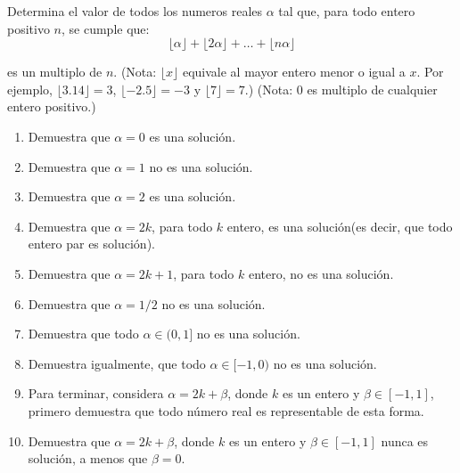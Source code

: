 \documentclass{article}
\begin{document}
Determina el valor de todos los numeros reales $\alpha$ tal que, para todo entero positivo $n$, se cumple que:
\[
    \lfloor \alpha \rfloor + \lfloor 2\alpha \rfloor + \ldots + \lfloor n\alpha \rfloor
\]

es un multiplo de $n$.
(Nota: $\lfloor x \rfloor$ equivale al mayor entero menor o igual a $x$. Por ejemplo, $\lfloor 3.14 \rfloor = 3$,
$\lfloor -2.5 \rfloor = -3$ y $\lfloor 7 \rfloor = 7$.)
(Nota: 0 es multiplo de cualquier entero positivo.)
\begin{enumerate}
    \item Demuestra que $\alpha = 0$ es una soluci\'on.
    \item Demuestra que $\alpha = 1$ no es una soluci\'on.
    \item Demuestra que $\alpha = 2$ es una soluci\'on.
    \item Demuestra que $\alpha = 2k$, para todo $k$ entero, es una soluci\'on(es decir, que todo entero par es soluci\'on).
    \item Demuestra que $\alpha = 2k+1$, para todo $k$ entero, no es una soluci\'on.
    \item Demuestra que $\alpha = 1/2$ no es una soluci\'on.
    \item Demuestra que todo $\alpha \in (0, 1]$ no es una soluci\'on.
    \item Demuestra igualmente, que todo $\alpha \in [-1, 0)$ no es una soluci\'on.
    \item Para terminar, considera $\alpha = 2k + \beta$, donde $k$ es un entero y $\beta \in [-1, 1]$, primero demuestra que todo n\'umero real es representable de esta forma.
    \item Demuestra que $\alpha = 2k + \beta$, donde $k$ es un entero y $\beta \in [-1, 1]$ nunca es soluci\'on, a menos que $\beta = 0$.
\end{enumerate}
\end{document}
